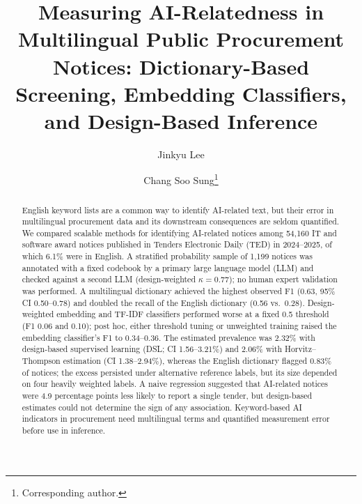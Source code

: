 \documentclass[runningheads]{llncs}
\begin{document}
\title{Measuring AI-Relatedness in Multilingual Public Procurement Notices: Dictionary-Based Screening, Embedding Classifiers, and Design-Based Inference}
\author{Jinkyu Lee \and Chang Soo Sung\thanks{Corresponding author.}}
\maketitle

\begin{abstract}
English keyword lists are a common way to identify AI-related text, but their error in multilingual procurement data and its downstream consequences are seldom quantified. We compared scalable methods for identifying AI-related notices among 54,160 IT and software award notices published in Tenders Electronic Daily (TED) in 2024--2025, of which 6.1\% were in English. A stratified probability sample of 1,199 notices was annotated with a fixed codebook by a primary large language model (LLM) and checked against a second LLM (design-weighted $\kappa=0.77$); no human expert validation was performed. A multilingual dictionary achieved the highest observed F1 (0.63, 95\% CI 0.50--0.78) and doubled the recall of the English dictionary (0.56 vs.\ 0.28). Design-weighted embedding and TF-IDF classifiers performed worse at a fixed 0.5 threshold (F1 0.06 and 0.10); post hoc, either threshold tuning or unweighted training raised the embedding classifier's F1 to 0.34--0.36. The estimated prevalence was 2.32\% with design-based supervised learning (DSL; CI 1.56--3.21\%) and 2.06\% with Horvitz--Thompson estimation (CI 1.38--2.94\%), whereas the English dictionary flagged 0.83\% of notices; the excess persisted under alternative reference labels, but its size depended on four heavily weighted labels. A naive regression suggested that AI-related notices were 4.9 percentage points less likely to report a single tender, but design-based estimates could not determine the sign of any association. Keyword-based AI indicators in procurement need multilingual terms and quantified measurement error before use in inference.
\end{abstract}
\end{document}

